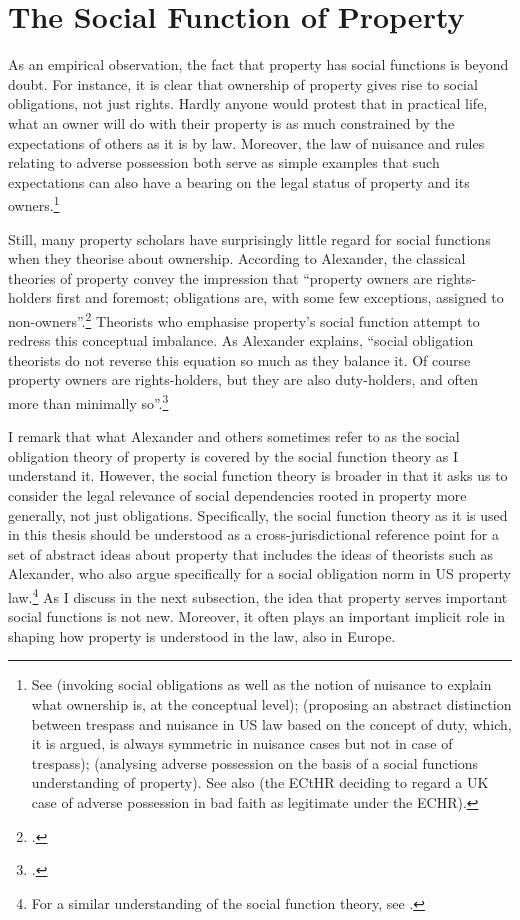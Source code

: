 \section{The Social Function of Property}\label{sec:2:4}

As an empirical observation, the fact that property has social functions is beyond doubt. For instance, it is clear that ownership of property gives rise to social obligations, not just rights. Hardly anyone would protest that in practical life, what an owner will do with their property is as much constrained by the expectations of others as it is by law. Moreover, the law of nuisance and rules relating to adverse possession both serve as simple examples that such expectations can also have a bearing on the legal status of property and its owners.\footnote{See \cite[314]{waldron85} (invoking social obligations as well as the notion of nuisance to explain what ownership is, at the conceptual level); \cite[197-198]{gerhard13} (proposing an abstract distinction between trespass and nuisance in US law based on the concept of duty, which, it is argued, is always symmetric in nuisance cases but not in case of trespass); \cite[1169-1172]{penalver07} (analysing adverse possession on the basis of a social functions understanding of property). See also \cite{pye07} (the ECtHR deciding to regard a UK case of adverse possession in bad faith as legitimate under the ECHR).}

Still, many property scholars have surprisingly little regard for social functions when they theorise about ownership. According to Alexander, the classical theories of property convey the impression that ``property owners are rights-holders first and foremost; obligations are, with some few exceptions, assigned to non-owners''.\footcite[1023]{alexander11} Theorists who emphasise property's social function attempt to redress this conceptual imbalance. As Alexander explains, ``social obligation theorists do not reverse this equation so much as they balance it. Of course property owners are rights-holders, but they are also duty-holders, and often more than minimally so''.\footnote{\cite[1023]{alexander11}.}

I remark that what Alexander and others sometimes refer to as the social obligation theory of property is covered by the social function theory as I understand it. However, the social function theory is broader in that it asks us to consider the legal relevance of social dependencies rooted in property more generally, not just obligations. Specifically, the social function theory as it is used in this thesis should be understood as a cross-jurisdictional reference point for a set of abstract ideas about property that includes the ideas of theorists such as Alexander, who also argue specifically for a social obligation norm in US property law.\footnote{For a similar understanding of the social function theory, see \cite{foster11}.} As I discuss in the next subsection, the idea that property serves important social functions is not new. Moreover, it often plays an important implicit role in shaping how property is understood in the law, also in Europe.

